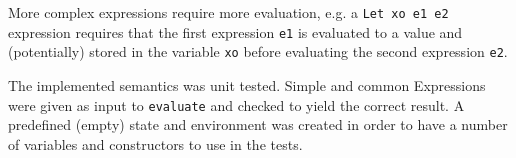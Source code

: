 More complex expressions require more evaluation, e.g. a \texttt{Let xo e1 e2}
expression requires that the first expression \texttt{e1} is evaluated to a
value and (potentially) stored in the variable \texttt{xo} before evaluating
the second expression \texttt{e2}.

The implemented semantics was unit tested. Simple and common Expressions were
given as input to \texttt{evaluate} and checked to yield the correct result.
A predefined (empty) state and environment was created in order to have a number
of variables and constructors to use in the tests. 
